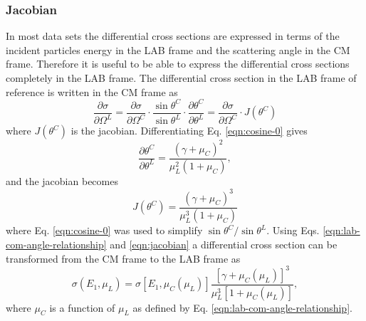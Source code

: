 \subsubsection{Jacobian}
In most data sets the differential cross sections are expressed in terms of the incident particles energy in the LAB frame and the scattering angle in the CM frame. Therefore it is useful to be able to express the differential cross sections completely in the LAB frame. The differential cross section in the LAB frame of reference is written in the CM frame as
\begin{equation}
  \dfrac{\partial \sigma}{\partial \Omega^L} = \dfrac{\partial \sigma}{\partial \Omega^C} \cdot \dfrac{\sin \theta^C}{\sin \theta^L} \cdot \dfrac{\partial \theta^C}{\partial \theta^L} = \dfrac{\partial \sigma}{\partial \Omega^C} \cdot J\left(\theta^C\right)
\end{equation}
where $J(\theta^C)$ is the jacobian. Differentiating Eq. \eqref{eqn:cosine-0} gives
\begin{equation}
  \dfrac{\partial \theta^C}{\partial \theta^L} = \dfrac{\left(\gamma + \mu_C\right)^2}{\mu_L^2 \left(1 + \mu_C\right)},
\end{equation}
and the jacobian becomes
\begin{equation} \label{eqn:jacobian}
  J(\theta^C) = \dfrac{\left(\gamma + \mu_C\right)^3}{\mu_L^3 \left(1 + \mu_C\right)}
\end{equation}
where Eq. \eqref{eqn:cosine-0} was used to simplify $\sin \theta^C / \sin \theta^L$. Using Eqs. \eqref{eqn:lab-com-angle-relationship} and \eqref{eqn:jacobian} a differential cross section can be transformed from the CM frame to the LAB frame as
\begin{equation}
  \sigma(E_1,\mu_L) = \sigma[E_1, \mu_C(\mu_L)] \dfrac{\left[\gamma + \mu_C(\mu_L)\right]^3}{\mu_L^3 \left[1 + \mu_C(\mu_L)\right]},
\end{equation}
where $\mu_C$ is a function of $\mu_L$ as defined by Eq. \eqref{eqn:lab-com-angle-relationship}.


